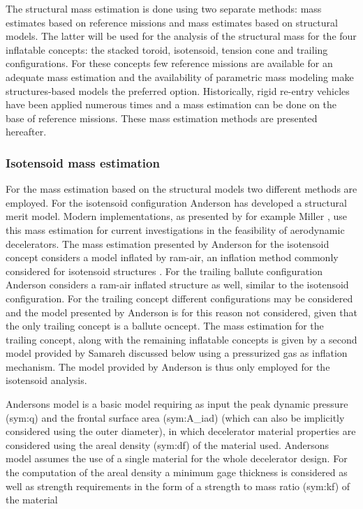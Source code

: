 The structural mass estimation is done using two separate methods: mass estimates based on reference missions and mass estimates based on structural models. The latter will be used for the analysis of the structural mass for the four inflatable concepts: the stacked toroid, isotensoid, tension cone and trailing configurations. For these concepts few reference missions are available for an adequate mass estimation and the availability of parametric mass modeling \cite{Anderson1969, Samareh2011} make structures-based models the preferred option. Historically, rigid re-entry vehicles have been applied numerous times and a mass estimation can be done on the base of reference missions. These mass estimation methods are presented hereafter.

\subsubsection{Isotensoid mass estimation}
For the mass estimation based on the structural models two different methods are employed. For the isotensoid configuration Anderson \cite{Anderson1969} has developed a structural merit model. Modern implementations, as presented by for example Miller \cite{Miller2014}, use this mass estimation for current investigations in the feasibility of aerodynamic decelerators. The mass estimation presented by Anderson for the isotensoid concept considers a model inflated by ram-air, an inflation method commonly considered for isotensoid structures \cite{Smith2011}. For the trailing ballute configuration Anderson considers a ram-air inflated structure as well, similar to the isotensoid configuration. For the trailing concept different configurations may be considered and the model presented by Anderson is for this reason not considered, given that the only trailing concept is a ballute ocncept. The mass estimation for the trailing concept, along with the remaining inflatable concepts is given by a second model provided by Samareh \cite{Samareh2011} discussed below using a pressurized gas as inflation mechanism. The model provided by Anderson is thus only employed for the isotensoid analysis. 

Andersons model \cite{anderson 1969} is a basic model requiring as input the peak dynamic pressure (\gls{sym:q}) and the frontal surface area (\gls{sym:A_iad}) (which can also be implicitly considered using the outer diameter), in which decelerator material properties are considered using the areal density (\gls{sym:df}) of the material used. Andersons model assumes the use of a single material for the whole decelerator design. For the computation of the areal density a minimum gage thickness is considered as well as strength requirements in the form of a strength to mass ratio (\gls{sym:kf}) of the material

